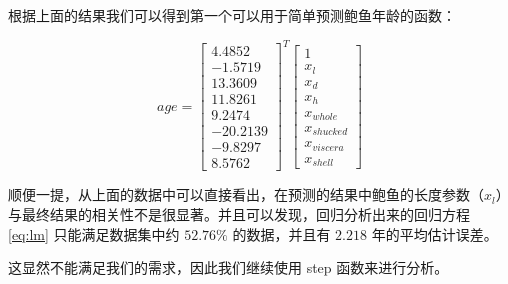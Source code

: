 根据上面的结果我们可以得到第一个可以用于简单预测鲍鱼年龄的函数：

\begin{equation} \label{eq:lm}
age = \begin{bmatrix} 4.4852 \\ -1.5719 \\ 13.3609 \\ 11.8261 \\  9.2474 \\-20.2139 \\ -9.8297 \\  8.5762 \end{bmatrix} ^{T} \begin{bmatrix} 1 \\ x_l \\ x_d \\ x_h \\ x_{whole} \\ x_{shucked} \\ x_{viscera} \\ x_{shell} \end{bmatrix}
\end{equation}

顺便一提，从上面的数据中可以直接看出，在预测的结果中鲍鱼的长度参数（$x_l$）与最终结果的相关性不是很显著。并且可以发现，回归分析出来的回归方程 \ref{eq:lm} 只能满足数据集中约 $52.76\%$ 的数据，并且有 $2.218$ 年的平均估计误差。

这显然不能满足我们的需求，因此我们继续使用 step 函数来进行分析。

